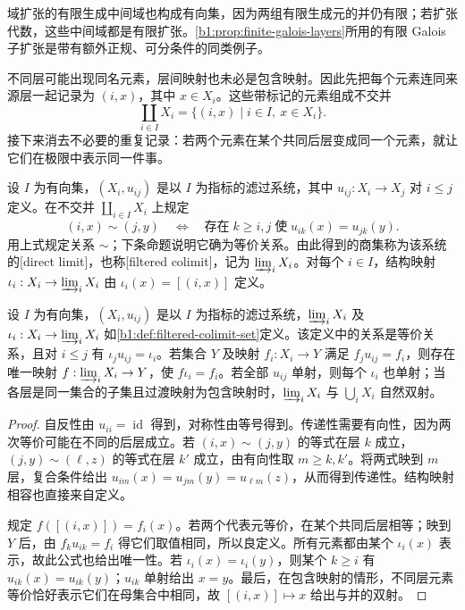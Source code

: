 \ProseParagraphBreak
域扩张的有限生成中间域也构成有向集，因为两组有限生成元的并仍有限；若扩张代数，这些中间域都是有限扩张。\cref{b1:prop:finite-galois-layers}所用的有限 Galois 子扩张是带有额外正规、可分条件的同类例子。

\ProseParagraphBreak
不同层可能出现同名元素，层间映射也未必是包含映射。因此先把每个元素连同来源层一起记录为 \((i,x)\)，其中 \(x\in X_i\)。这些带标记的元素组成不交并
\[
	\coprod_{i\in I}X_i=\{(i,x)\mid i\in I,\ x\in X_i\}.
\]
接下来消去不必要的重复记录：若两个元素在某个共同后层变成同一个元素，就让它们在极限中表示同一件事。

\begin{definition}\label{b1:def:filtered-colimit-set}
	设 \(I\) 为有向集，\((X_i,u_{ij})\) 是以 \(I\) 为指标的滤过系统，其中 \(u_{ij}:X_i\rightarrow X_j\) 对 \(i\leq j\) 定义。在不交并 \(\coprod_{i\in I}X_i\) 上规定
	\[
		(i,x)\sim(j,y) \quad\Longleftrightarrow\quad \text{存在}\;k\geq i,j\;\text{使}\;u_{ik}(x)=u_{jk}(y).
	\]
	用上式规定关系 \(\sim\)；下条命题说明它确为等价关系。由此得到的商集称为该系统的[direct limit]，也称[filtered colimit]，记为 \(\varinjlim_iX_i\)。对每个 \(i\in I\)，结构映射 \(\iota_i:X_i\rightarrow\varinjlim_iX_i\) 由 \(\iota_i(x)=[(i,x)]\) 定义。
\end{definition}


\begin{proposition}\label{b1:prop:filtered-colimit-universal}
	设 \(I\) 为有向集，\((X_i,u_{ij})\) 是以 \(I\) 为指标的滤过系统，\(\varinjlim_iX_i\) 及 \(\iota_i:X_i\rightarrow\varinjlim_iX_i\) 如\cref{b1:def:filtered-colimit-set}定义。该定义中的关系是等价关系，且对 \(i\leq j\) 有 \(\iota_j u_{ij}=\iota_i\)。若集合 \(Y\) 及映射 \(f_i:X_i\rightarrow Y\) 满足 \(f_j u_{ij}=f_i\)，则存在唯一映射 \(f:\varinjlim_iX_i\rightarrow Y\)，使 \(f\iota_i=f_i\)。若全部 \(u_{ij}\) 单射，则每个 \(\iota_i\) 也单射；当各层是同一集合的子集且过渡映射为包含映射时，\(\varinjlim_iX_i\) 与 \(\bigcup_iX_i\) 自然双射。
\end{proposition}

\begin{proof}
	自反性由 \(u_{ii}=\operatorname{id}\) 得到，对称性由等号得到。传递性需要有向性，因为两次等价可能在不同的后层成立。若 \((i,x)\sim(j,y)\) 的等式在层 \(k\) 成立，\((j,y)\sim(\ell,z)\) 的等式在层 \(k'\) 成立，由有向性取 \(m\geq k,k'\)。将两式映到 \(m\) 层，复合条件给出 \(u_{im}(x)=u_{jm}(y)=u_{\ell m}(z)\)，从而得到传递性。结构映射相容也直接来自定义。

	规定 \(f([(i,x)])=f_i(x)\)。若两个代表元等价，在某个共同后层相等；映到 \(Y\) 后，由 \(f_k u_{ik}=f_i\) 得它们取值相同，所以良定义。所有元素都由某个 \(\iota_i(x)\) 表示，故此公式也给出唯一性。若 \(\iota_i(x)=\iota_i(y)\)，则某个 \(k\geq i\) 有 \(u_{ik}(x)=u_{ik}(y)\)；\(u_{ik}\) 单射给出 \(x=y\)。最后，在包含映射的情形，不同层元素等价恰好表示它们在母集合中相同，故 \([(i,x)]\mapsto x\) 给出与并的双射。
\end{proof}

